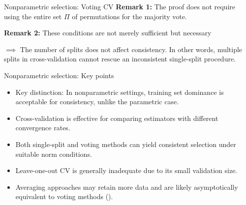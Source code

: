 \documentclass{beamer}
\newcommand{\0}{\emptyset}
\newcommand{\1}{\mathmybb{1}}
\begin{document}
\begin{frame}{Nonparametric selection: Voting CV}
  \textbf{Remark 1: } The proof does not require using the entire set \(\Pi\) of permutations for the majority vote. 
  
  \textbf{Remark 2: }These conditions are not merely sufficient but necessary
  
  \(\implies \) The number of splits does not affect consistency. In other words, multiple splits in cross-validation cannot rescue an inconsistent single-split procedure.
\end{frame}

\begin{frame}{Nonparametric selection: Key points}
  \begin{itemize}
    \item Key distinction: In nonparametric settings, training set dominance is acceptable for consistency, unlike the parametric case.
    \item Cross-validation is effective for comparing estimators with different convergence rates.
    \item Both single-split and voting methods can yield consistent selection under suitable norm conditions.
    \item Leave-one-out CV is generally inadequate due to its small validation size.
    \item Averaging approaches may retain more data and are likely asymptotically equivalent to voting methods (\cite{yang_2007}).
  \end{itemize}
\end{frame}
\end{document}
